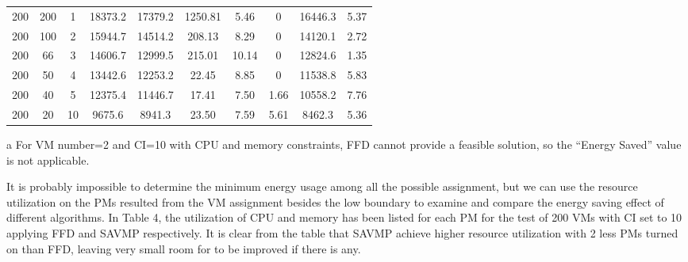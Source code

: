 \documentclass[10pt, conference, compsocconf]{IEEEtran}
\begin{document}
\begin{table*}[t]
\begin{center}
\begin{threeparttable}
\begin{tabular}{c|c|c|c|c|c|c|c|c|c}
\hline
200 &200 & 1 & 18373.2 & 17379.2 & 1250.81 & 5.46 & 0 & 16446.3 & 5.37\\
200 &100 & 2 & 15944.7 & 14514.2 & 208.13 & 8.29 & 0 & 14120.1 & 2.72\\
200 &66  & 3 & 14606.7 & 12999.5 & 215.01 & 10.14 & 0 & 12824.6 & 1.35\\
200 &50  & 4 & 13442.6 & 12253.2 & 22.45 & 8.85 & 0 & 11538.8 & 5.83\\
200 &40  & 5 & 12375.4 & 11446.7 & 17.41 & 7.50 & 1.66 & 10558.2 & 7.76\\
200 &20  & 10 & 9675.6 & 8941.3 & 23.50 & 7.59 & 5.61 & 8462.3 & 5.36\\
\hline\hline
\end{tabular}
\begin{tablenotes}
\item [a] For VM number=2 and CI=10 with CPU and memory constraints, FFD cannot
provide a feasible solution, so the ``Energy Saved'' value is not applicable.
\end{tablenotes}
\end{threeparttable}

\end{center}
\end{table*}



It is probably impossible to determine the minimum energy usage among all the
possible assignment, but we can use the resource utilization on the PMs resulted from the
VM assignment besides the low boundary to examine and compare the energy saving
effect of different algorithms. In Table 4, the utilization of CPU and memory
has been listed for each PM for the test of 200 VMs with CI set to 10 applying FFD and
SAVMP respectively. It is clear from the table that SAVMP achieve higher
resource utilization with 2 less PMs turned on than FFD, leaving very small
room for to be improved if there is any.
\end{document}
